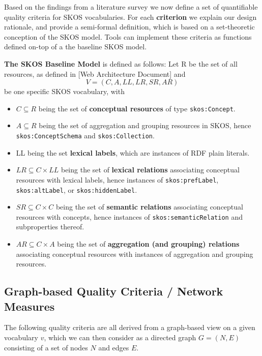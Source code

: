 \documentclass{llncs}
\begin{document}
Based on the findings from a literature survey we now define a set of quantifiable quality criteria for SKOS vocabularies. For each \textbf{criterion} we explain our design rationale, and provide a semi-formal definition, which is based on a set-theoretic conception of the SKOS model. Tools can implement these criteria as functions defined on-top of a the baseline SKOS model.

\begin{definition} \textbf{The SKOS Baseline Model} is defined as follows:
Let R be the set of all resources, as defined in [Web Architecture Document] and \[V = (C, A, LL, LR, SR, AR)\] be one specific SKOS vocabulary, with

\begin{itemize}
	\item \(C \subseteq R\) being the set of \textbf{conceptual resources} of type \texttt{skos:Concept}.
	\item \(A \subseteq R\) being the set of aggregation and grouping resources in SKOS, hence \texttt{skos:ConceptSchema} and \texttt{skos:Collection}.
	\item LL being the set \textbf{lexical labels}, which are instances of RDF plain literals.
	\item \(LR \subseteq C \times LL\) being the set of \textbf{lexical relations} associating conceptual resources with lexical labels, hence instances of \texttt{skos:prefLabel}, \texttt{skos:altLabel}, or \texttt{skos:hiddenLabel}.
\item \(SR \subseteq C \times C\) being the set of \textbf{semantic relations} associating conceptual resources with concepts, hence instances of \texttt{skos:semanticRelation} and subproperties thereof.
\item \(AR \subseteq C \times A\) being the set of \textbf{aggregation (and grouping) relations} associating conceptual resources with instances of aggregation and grouping resources.
\end{itemize}
\end{definition}

\subsection{Graph-based Quality Criteria / Network Measures}
The following quality criteria are all derived from a graph-based view on a given vocabulary \(v\), which we can then consider as a directed graph \(G=(N,E)\) consisting of a set of nodes \(N\) and edges \(E\).
\end{document}
